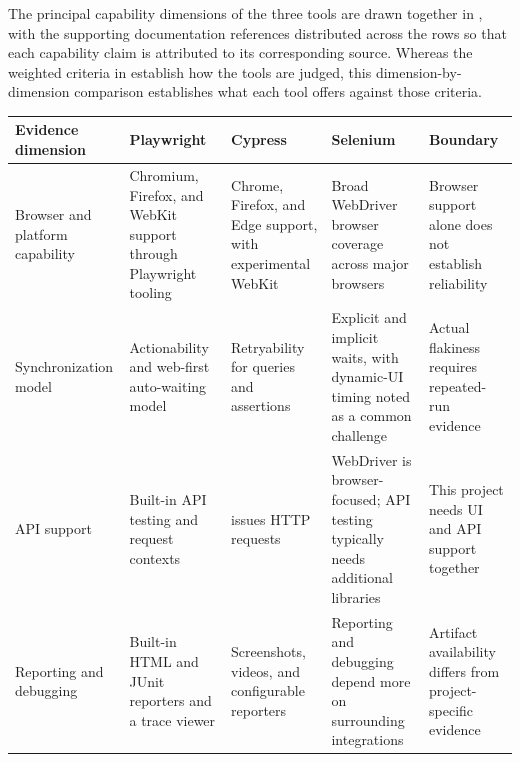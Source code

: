 The principal capability dimensions of the three tools are drawn together in , with the supporting documentation references distributed across the rows so that each capability claim is attributed to its corresponding source. Whereas the weighted criteria in  establish how the tools are judged, this dimension-by-dimension comparison establishes what each tool offers against those criteria.

\begin{table}[htbp]
  \centering
  \tablefont
  \setlength{\tabcolsep}{4pt}
  \begin{tabularx}{\textwidth}{>{\RaggedRight\arraybackslash}p{}YYY>{\RaggedRight\arraybackslash}p{0.14\textwidth}}
    \toprule
    Evidence dimension & Playwright & Cypress & Selenium & Boundary \\
    \midrule
    Browser and platform capability & Chromium, Firefox, and WebKit support through Playwright tooling \autocite{playwright_docs_intro_2026} & Chrome, Firefox, and Edge support, with experimental WebKit \autocite{cypress_browser_support_2026} & Broad WebDriver browser coverage across major browsers \autocite{selenium_docs_browsers_2026} & Browser support alone does not establish reliability \\
    Synchronization model & Actionability and web-first auto-waiting model \autocite{playwright_docs_actionability_2026} & Retryability for queries and assertions \autocite{cypress_docs_retryability_2026} & Explicit and implicit waits, with dynamic-UI timing noted as a common challenge \autocite{selenium_docs_waits_2026} & Actual flakiness requires repeated-run evidence \\
    API support & Built-in API testing and request contexts \autocite{playwright_docs_api_testing_2026} &  issues HTTP requests \autocite{cypress_docs_request_2026} & WebDriver is browser-focused; API testing typically needs additional libraries \autocite{selenium_webdriver_2026} & This project needs UI and API support together \\
    Reporting and debugging & Built-in HTML and JUnit reporters and a trace viewer \autocite{playwright_docs_reporters_2026,playwright_docs_trace_viewer_2026} & Screenshots, videos, and configurable reporters \autocite{cypress_docs_screenshots_videos_2026,cypress_docs_reporters_2026} & Reporting and debugging depend more on surrounding integrations \autocite{selenium_page_object_models_2026} & Artifact availability differs from project-specific evidence \\

\end{tabularx}
\end{table}

